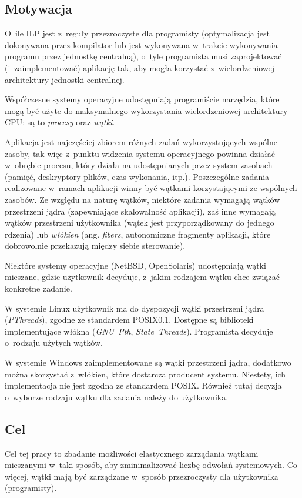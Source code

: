 \documentclass{mwart}
\begin{document}
\subsection{Motywacja} 
%
\indent
	O~ile ILP jest z~reguły przezroczyste dla programisty (optymalizacja jest dokonywana przez kompilator lub jest wykonywana w~trakcie wykonywania programu
	przez jednostkę centralną),	o~tyle programista musi zaprojektować (i~zaimplementować) aplikację tak, aby mogła korzystać z~wielordzeniowej
	architektury jednostki centralnej.
\par
%
\indent
	Współczesne systemy operacyjne udostępniają programiście narzędzia, które mogą być użyte do maksymalnego wykorzystania 
	wielordzeniowej architektury CPU: są to \emph{procesy} oraz \emph{wątki}.
\par
%
\indent
	Aplikacja jest najczęściej zbiorem różnych zadań wykorzystujących wspólne zasoby, tak więc z~punktu widzenia systemu operacyjnego 
	powinna działać w~obrębie procesu, który działa na udostępnianych przez system zasobach (pamięć, deskryptory plików, czas wykonania, itp.).
	Poszczególne zadania realizowane w~ramach aplikacji winny być wątkami korzystającymi ze wspólnych zasobów.
	Ze względu na naturę wątków, niektóre zadania wymagają wątków przestrzeni jądra (zapewniające skalowalność aplikacji), zaś inne wymagają
	wątków przestrzeni użytkownika (wątek jest przyporządkowany do jednego rdzenia) lub \emph{włókien} (ang. \emph{fibers}, autonomiczne fragmenty
	aplikacji, które dobrowolnie przekazują między siebie sterowanie).
\par
%
\indent
	Niektóre systemy operacyjne (NetBSD, OpenSolaris) udostępniają wątki mieszane, gdzie użytkownik decyduje, z~jakim rodzajem wątku 
	chce związać konkretne zadanie.
\par
%
\indent
	W systemie Linux użytkownik ma do dyspozycji wątki przestrzeni jądra \linebreak (\emph{PThreads}), zgodne ze standardem POSIX0.1.
	Dostępne są biblioteki implementujące włókna (\emph{GNU~Pth}, \emph{State~Threads}). Programista decyduje o~rodzaju użytych wątków.
\par
%
\indent
	W systemie Windows zaimplementowane są wątki przestrzeni jądra, dodatkowo można skorzystać z~włókien, które dostarcza producent systemu.
	Niestety, ich implementacja nie jest zgodna ze standardem POSIX. Również tutaj decyzja o~wyborze rodzaju wątku dla zadania należy do użytkownika.
\par
%
\subsection{Cel}
%
\indent
	Cel tej pracy to zbadanie możliwości elastycznego zarządania wątkami mieszanymi w~taki sposób, aby zminimalizować liczbę odwołań systemowych.
	Co więcej, wątki mają być zarządzane w~sposób przezroczysty dla użytkownika (programisty). 
\par
%
\end{document}
